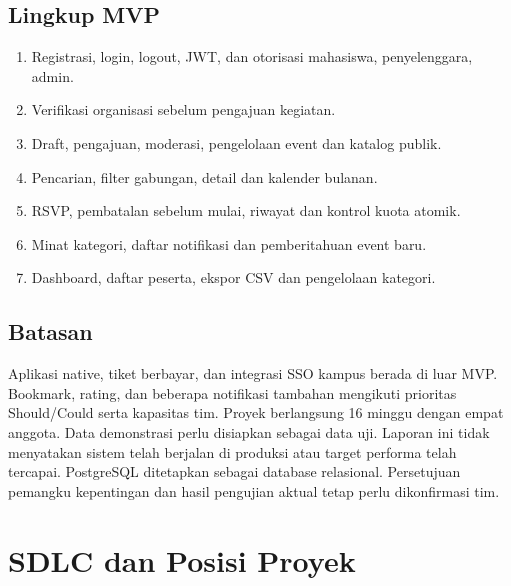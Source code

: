\documentclass[11pt,a4paper]{article}
\newcommand{\page}[1]{\clearpage\section{#1}}
\begin{document}
\subsection{Lingkup MVP}
\begin{enumerate}
\item Registrasi, login, logout, JWT, dan otorisasi mahasiswa, penyelenggara, admin.
\item Verifikasi organisasi sebelum pengajuan kegiatan.
\item Draft, pengajuan, moderasi, pengelolaan event dan katalog publik.
\item Pencarian, filter gabungan, detail dan kalender bulanan.
\item RSVP, pembatalan sebelum mulai, riwayat dan kontrol kuota atomik.
\item Minat kategori, daftar notifikasi dan pemberitahuan event baru.
\item Dashboard, daftar peserta, ekspor CSV dan pengelolaan kategori.
\end{enumerate}
\subsection{Batasan}
Aplikasi native, tiket berbayar, dan integrasi SSO kampus berada di luar MVP. Bookmark, rating, dan beberapa notifikasi tambahan mengikuti prioritas Should/Could serta kapasitas tim. Proyek berlangsung 16 minggu dengan empat anggota. Data demonstrasi perlu disiapkan sebagai data uji.
Laporan ini tidak menyatakan sistem telah berjalan di produksi atau target performa telah tercapai. PostgreSQL ditetapkan sebagai database relasional. Persetujuan pemangku kepentingan dan hasil pengujian aktual tetap perlu dikonfirmasi tim.
\page{SDLC dan Posisi Proyek}
\end{document}
